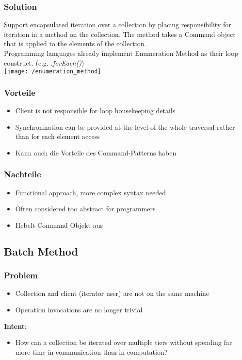 \subsubsection{Solution}
Support encapsulated iteration over a collection by placing responsibility for iteration in a method on the collection. The method takes a Command object that is applied to the elements of the collection.\\
Programming languages already implement Enumeration Method as their loop construct. (e.g. \textit{.forEach()})\\
\texttt{[image: /enumeration\_method]}
\subsubsection{Vorteile}
\begin{itemize}[topsep=0pt]
    \itemsep -0.4em
    \item Client is not responsible for loop housekeeping details
    \item Synchronization can be provided at the level of the whole traversal rather than for each element access
    \item Kann auch die Vorteile des Command-Patterns haben
\end{itemize}
\subsubsection{Nachteile}
\begin{itemize}[topsep=0pt]
    \itemsep -0.4em
    \item Functional approach, more complex syntax needed
    \item Often considered too abstract for programmers
    \item Hebelt Command Objekt aus
\end{itemize}

\subsection{Batch Method}
\subsubsection{Problem}
\begin{itemize}[topsep=0pt]
    \itemsep -0.4em
    \item Collection and client (iterator user) are not on the same machine
    \item Operation invocations are no longer trivial
\end{itemize}
\textbf{Intent:}
\begin{itemize}[topsep=0pt]
    \itemsep -0.4em
    \item How can a collection be iterated over multiple tiers without spending far more time in communication than in computation?
\end{itemize}
